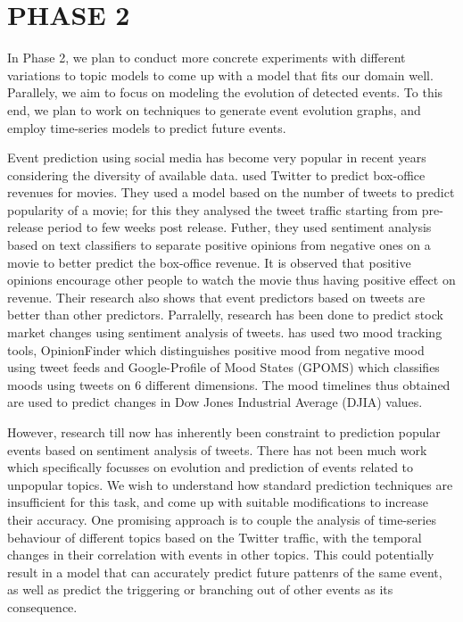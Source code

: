 \section{\uppercase{Phase 2}}
In Phase 2, we plan to conduct more concrete experiments with different variations to topic models to come up with a model that fits our domain well. Parallely, we aim to focus on modeling the evolution of detected events. To this end, we plan to work on techniques to generate event evolution graphs, and employ time-series models to predict future events. 

Event prediction using social media has become very popular in recent years considering the diversity of available data. \cite{asur2010predicting} used Twitter to predict box-office revenues for movies. They used a model based on the number of tweets to predict popularity of a movie; for this they analysed the tweet traffic starting from pre-release period to few weeks post release. Futher, they used sentiment analysis based on text classifiers to separate positive opinions from negative ones on a movie to better predict the box-office revenue. It is observed that positive opinions encourage other people to watch the movie thus having positive effect on revenue. Their research also shows that event predictors based on tweets are better than other predictors. Parralelly, research has been done to predict stock market changes using sentiment analysis of tweets. \cite{bollen2011twitter} has used two mood tracking tools, OpinionFinder which distinguishes positive mood from negative mood using tweet feeds and Google-Profile of Mood States (GPOMS) which classifies moods using tweets on 6 different dimensions. The mood timelines thus obtained are used to predict changes in Dow Jones Industrial Average (DJIA) values.

However, research till now has inherently been constraint to prediction popular events based on sentiment analysis of tweets. There has not been much work which specifically focusses on evolution and prediction of events related to unpopular topics. We wish to understand how standard prediction techniques are insufficient for this task, and come up with suitable modifications to increase their accuracy. One promising approach is to couple the analysis of time-series behaviour of different topics based on the Twitter traffic, with the temporal changes in their correlation with events in other topics. This could potentially result in a model that can accurately predict future pattenrs of the same event, as well as predict the triggering or branching out of other events as its consequence.